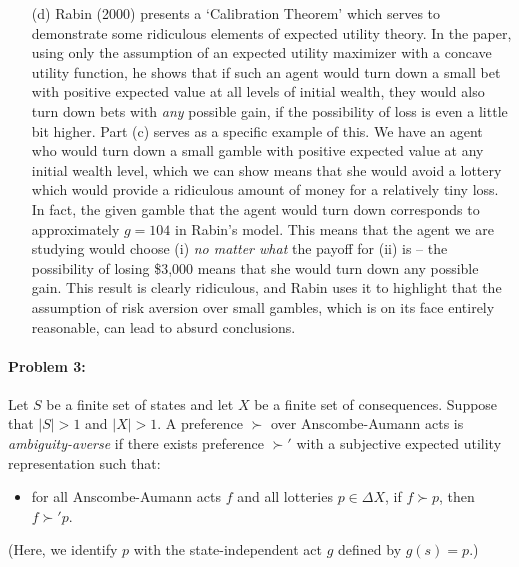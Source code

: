 \documentclass[12pt]{article}
\begin{document}
\begin{itemize}
    \item[(d)] Rabin (2000) presents a `Calibration Theorem' which serves to demonstrate some ridiculous elements of expected utility theory. In the paper, using only the assumption of an expected utility maximizer with a concave utility function, he shows that if such an agent would turn down a small bet with positive expected value at all levels of initial wealth, they would also turn down bets with \emph{any} possible gain, if the possibility of loss is even a little bit higher. Part (c) serves as a specific example of this. We have an agent who would turn down a small gamble with positive expected value at any initial wealth level, which we can show means that she would avoid a lottery which would provide a ridiculous amount of money for a relatively tiny loss. In fact, the given gamble that the agent would turn down corresponds to approximately $g = 104$ in Rabin's model. This means that the agent we are studying would choose (i) \emph{no matter what} the payoff for (ii) is -- the possibility of losing \$3,000 means that she would turn down any possible gain. This result is clearly ridiculous, and Rabin uses it to highlight that the assumption of risk aversion over small gambles, which is on its face entirely reasonable, can lead to absurd conclusions. 
\end{itemize}

\paragraph{Problem 3:} Let $S$ be a finite set of states and let $X$ be a finite set of consequences. Suppose that $|S| > 1$ and $|X| > 1$. A preference $\succ$ over Anscombe-Aumann acts is \emph{ambiguity-averse} if there exists preference $\succ'$ with a subjective expected utility representation such that:
\begin{itemize}
    \item for all Anscombe-Aumann acts $f$ and all lotteries $p \in \Delta X$, if $f \succ p$, then $f \succ' p$. 
\end{itemize}
(Here, we identify $p$ with the state-independent act $g$ defined by $g(s) = p$.)
\end{document}
